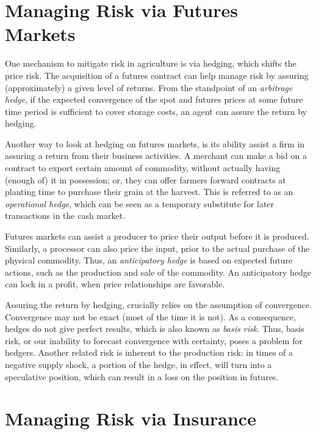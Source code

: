 \documentclass[]{book}
\begin{document}
\section{Managing Risk via Futures
Markets}\label{managing-risk-via-futures-markets}

One mechanism to mitigate risk in agriculture is via hedging, which
shifts the price risk. The acquisition of a futures contract can help
manage risk by assuring (approximately) a given level of returns. From
the standpoint of an \emph{arbitrage hedge}, if the expected convergence
of the spot and futures prices at some future time period is sufficient
to cover storage costs, an agent can assure the return by hedging.

Another way to look at hedging on futures markets, is its ability assist
a firm in assuring a return from their business activities. A merchant
can make a bid on a contract to export certain amount of commodity,
without actually having (enough of) it in possession; or, they can offer
farmers forward contracts at planting time to purchase their grain at
the harvest. This is referred to as an \emph{operational hedge}, which
can be seen as a temporary substitute for later transactions in the cash
market.

Futures markets can assist a producer to price their output before it is
produced. Similarly, a processor can also price the input, prior to the
actual purchase of the physical commodity. Thus, an \emph{anticipatory
hedge} is based on expected future actions, such as the production and
sale of the commodity. An anticipatory hedge can lock in a profit, when
price relationships are favorable.

Assuring the return by hedging, crucially relies on the assumption of
convergence. Convergence may not be exact (most of the time it is not).
As a consequence, hedges do not give perfect results, which is also
known as \emph{basis risk}. Thus, basis risk, or our inability to
forecast convergence with certainty, poses a problem for hedgers.
Another related risk is inherent to the production risk: in times of a
negative supply shock, a portion of the hedge, in effect, will turn into
a speculative position, which can result in a loss on the position in
futures.

\section{Managing Risk via Insurance}\label{managing-risk-via-insurance}
\end{document}
